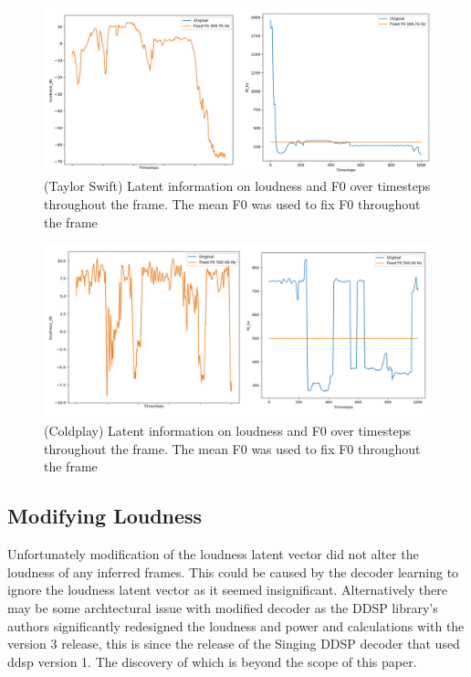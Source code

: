 \begin{figure}[!ht]
    \centering
    \includegraphics[width=\textwidth]{research/results/TaylorSwift/FixedF0Graphs.png}
    \caption{(Taylor Swift) Latent information on loudness and F0 over timesteps throughout the frame. The mean F0 was used to fix F0 throughout the frame}
\end{figure}

\begin{figure}[!ht]
    \centering
    \includegraphics[width=\textwidth]{research/results/Coldplay/FixedF0Graphs.png}
    \caption{(Coldplay) Latent information on loudness and F0 over timesteps throughout the frame. The mean F0 was used to fix F0 throughout the frame}
\end{figure}

\subsection{Modifying Loudness}

Unfortunately modification of the loudness latent vector did not alter the loudness of any inferred frames. This could be caused by the decoder learning to ignore the loudness latent vector as it seemed insignificant. Alternatively there may be some archtectural issue with modified decoder as the DDSP library's authors significantly redesigned the loudness and power and calculations with the version 3 release, this is since the release of the Singing DDSP decoder that used ddsp version 1. The discovery of which is beyond the scope of this paper.


